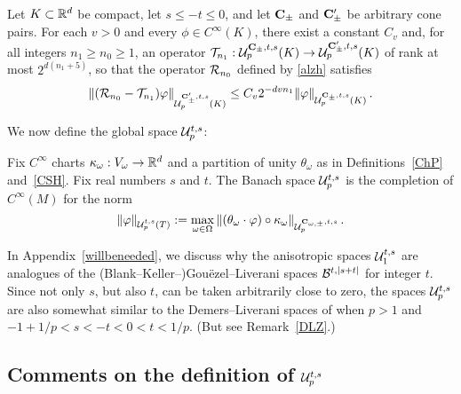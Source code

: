 \documentclass[10pt,twoside]{amsart}
\begin{document}
\begin{lemma}\label{finiterankU}
Let $K\subset \mathbb{R}^d$ be compact, let $s\le -t\le 0$, and let
$\mathbf{C}_\pm$ and $\mathbf{C}'_\pm$ be arbitrary cone pairs.
For each $v >0$ and every  $\phi \in C^\infty(K)$, there exist a constant
$C_v$ and, for all integers $n_1\ge n_0\ge 1$,  an operator
 $\mathcal{T}_{n_1}:
\mathcal{U}^{\mathbf{C}_\pm,t,s}_p(K)\to \mathcal{U}^{\mathbf{C}_\pm',t,s}_p(K)$ of rank at most  $2^{d(n_1+5)}$, so that
the operator $\mathcal {R}_{n_0}$ defined by \eqref{alzh}
satisfies 
$$\|(\mathcal {R}_{n_0} -  \mathcal{T}_{n_1})\varphi\|_{\mathcal{U}^{\mathbf{C}_\pm',t,s}_p(K)}\le C_v 2^{-dv n_1 }
\|\varphi\|_{\mathcal{U}^{\mathbf{C}_\pm,t,s}_p(K)} \, .
$$
\end{lemma}




\medskip


We now define the global space $\mathcal{U}^{t,s}_{p}$:

\begin{definition}\label{defnormU}
Fix  $C^\infty$ charts $\kappa_\omega:V_\omega\to \mathbb{R}^d$
and a partition of unity $\theta_\omega$ as in
 Definitions~\ref{ChP} and~\ref{CSH}.
Fix  real numbers $s$ and $t$.
The Banach space $\mathcal{U}^{t,s}_p$  is 
the completion of $C^{\infty}(M)$ for the norm
\[
\|\varphi\|_{\mathcal{U}^{t,s}_{p}(T)}:=\max_{\omega \in \Omega} 
\|(\theta_\omega\cdot \varphi)\circ \kappa_\omega\|_{\mathcal{U}^{\mathbf{C}_{\omega,\pm}, t,s}_{p}}\, .
\]  
\end{definition}
 
In Appendix~\ref{willbeneeded},
we discuss why the anisotropic spaces $\mathcal{U}^{t,s}_1$ are analogues of the (Blank--Keller--)Gou\"ezel--Liverani \cite{BKL,GL1, GL2}
spaces $\mathcal{B}^{t,|s+t|}$ for integer $t$.
Since
not only $s$, but also $t$, can be taken arbitrarily close to zero,
the spaces $\mathcal{U}^{t,s}_p$ are also somewhat similar to  the Demers--Liverani spaces of \cite{DL} when $p>1$
and $-1+1/p<s<-t<0<t<1/p$. (But see Remark~\ref{DLZ}.)



\subsection{Comments on the definition of $\mathcal{U}^{t,s}_p$}
\end{document}
